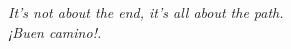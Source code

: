 \documentclass[11pt, a4paper, oneside]{Thesis} %
\begin{document}

%
%
%
%
%
%


\pagestyle{empty} %

\null\vfill %
\textit{It's not about the end, it's all about the
path.\\ \hfil ¡Buen camino!.}
%
\end{document}
